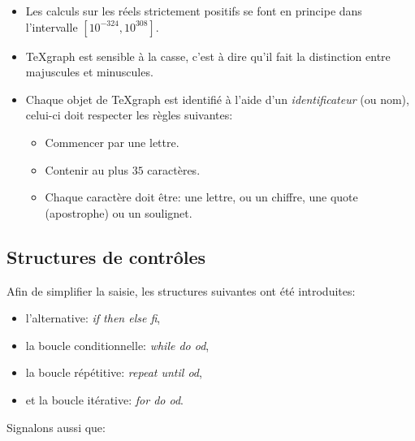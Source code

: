 \begin{itemize}
\item Les calculs sur les réels strictement positifs se font en principe dans l'intervalle $[10^{-324},10^{308}]$.

\item TeXgraph est sensible à la casse, c'est à dire qu'il fait la distinction entre majuscules et minuscules.

\item Chaque objet de TeXgraph est identifié à l'aide d'un \textit{identificateur} (ou nom), celui-ci doit respecter les règles suivantes:
    \begin{itemize}
    \item Commencer par une lettre.
    \item Contenir au plus $35$ caractères.
    \item Chaque caractère doit être: une lettre, ou un chiffre, une quote (apostrophe) ou un soulignet.
    \end{itemize}
\end{itemize}

\subsection{Structures de contrôles}

Afin de simplifier la saisie, les structures suivantes ont été introduites:

\begin{itemize}
\item l'alternative: \textsl{if then else fi},\label{cmdif}
\item la boucle conditionnelle: \textsl{while do od},
\item la boucle répétitive: \textsl{repeat until od},\label{cmdrepeat}
\item et la boucle itérative: \textsl{for do od}.\label{cmdfor}
\end{itemize}
 

Signalons aussi que:

